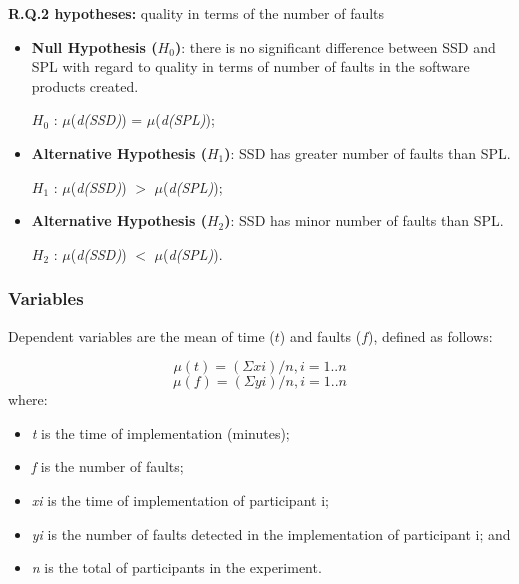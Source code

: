 \textbf{R.Q.2 hypotheses:}
quality in terms of the number of faults
	\begin{itemize}
	
	\item \textbf{Null Hypothesis ($H_{0}$)}: there is no significant difference between SSD and SPL with regard to quality in terms of number of faults in the software products created.
	
	$H_{0}$ : $\mu$(\textit{d(SSD)}) =  $\mu$(\textit{d(SPL)});
	
	\item \textbf{Alternative Hypothesis ($H_{1}$)}: SSD has greater number of faults than SPL.
	
	$H_{1}$ : $\mu$(\textit{d(SSD)}) $>$ $\mu$(\textit{d(SPL)});
		
	\item \textbf{Alternative Hypothesis ($H_{2}$)}: SSD has minor number of faults than SPL.
	
	$H_{2}$ :  $\mu$(\textit{d(SSD)}) $<$ $\mu$(\textit{d(SPL)}).		
	
	\end{itemize}

\subsubsection{Variables}

Dependent variables are the mean of time ($t$) and faults ($f$), defined as follows:

\small

\begin{equation}\label{eq:1}
\mu{(t)}=(\Sigma xi)/n, i = 1..n
\end{equation}
\begin{equation}\label{eq:2}
\mu{(f)}=(\Sigma yi)/n, i = 1..n
\end{equation}
\normalsize 
where:
\begin{itemize}
\item \textit{t} is the time of implementation (minutes);
\item \textit{f} is the number of faults;
\item \textit{xi} is the time of implementation of participant i;
\item \textit{yi} is the number of faults detected in the implementation of participant i; and
\item \textit{n} is the total of participants in the experiment.
\end{itemize}
\normalsize

